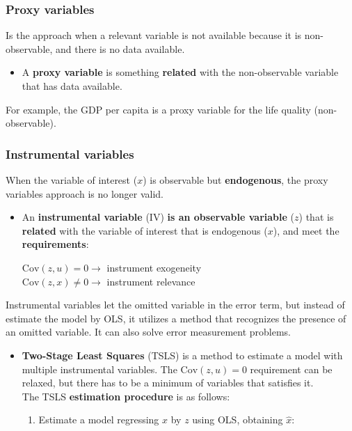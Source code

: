 \documentclass[10pt, a4paper, landscape]{extarticle}
\newcommand{\Cov}{\mathrm{Cov}}
\begin{document}
\begin{multicols}{3}
		\subsubsection*{Proxy variables}
			Is the approach when a relevant variable is not available because it is non-observable, and there is no data available.
			\begin{itemize}[leftmargin=*]
				\item A \textbf{proxy variable} is something \textbf{related} with the non-observable variable that has data available.
			\end{itemize}
			For example, the GDP per capita is a proxy variable for the life quality (non-observable).
		\subsubsection*{Instrumental variables}
			When the variable of interest ($x$) is observable but \textbf{endogenous}, the proxy variables approach is no longer valid.
			\begin{itemize}[leftmargin=*]
				\item An \textbf{instrumental variable} (IV) \textbf{is an observable variable} ($z$) that is \textbf{related} with the variable of interest that is endogenous ($x$), and meet the \textbf{requirements}:
				\begin{center}
					$\Cov(z,u) = 0 \rightarrow$ instrument exogeneity \\
					$\Cov(z,x) \neq 0 \rightarrow$ instrument relevance
				\end{center}
			\end{itemize}
			Instrumental variables let the omitted variable in the error term, but instead of estimate the model by OLS, it utilizes a method that recognizes the presence of an omitted variable. It can also solve error measurement problems.
			\begin{itemize}[leftmargin=*]
				\item \textbf{Two-Stage Least Squares} (TSLS) is a method to estimate a model with multiple instrumental variables. The $\Cov(z,u) = 0$ requirement can be relaxed, but there has to be a minimum of variables that satisfies it. \\
				The TSLS \textbf{estimation procedure} is as follows:
				\begin{enumerate}[leftmargin=*]
					\item Estimate a model regressing $x$ by $z$ using OLS, obtaining $\hat{x}$:
					\begin{center}

\end{center}
\end{enumerate}
\end{itemize}
\end{multicols}
\end{document}
